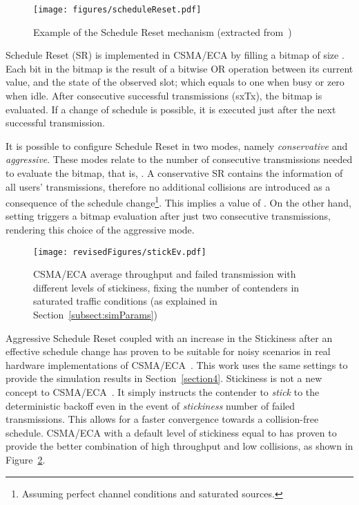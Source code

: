 \documentclass[a4paper]{article}
\begin{document}
	\begin{figure}[t!]
	\centering
		\texttt{[image: figures/scheduleReset.pdf]}
		\caption{Example of the Schedule Reset mechanism (extracted from~\cite{sanabria2014high})}
		\label{fig:scheduleReset1}
	\end{figure}

Schedule Reset (SR) is implemented in CSMA/ECA by filling a bitmap  of size . Each bit  in the bitmap is the result of a bitwise OR operation between its current value,  and the state of the observed slot; which equals to one when busy or zero when idle. After  consecutive successful transmissions (sxTx), the bitmap is evaluated. If a change of schedule is possible, it is executed just after the next successful transmission.

It is possible to configure Schedule Reset in two modes, namely \emph{conservative} and \emph{aggressive}. These modes relate to the number of consecutive transmissions needed to evaluate the bitmap, that is, . A conservative SR contains the information of all users' transmissions, therefore no additional collisions are introduced as a consequence of the schedule change\footnote{Assuming perfect channel conditions and saturated sources.}. This implies a value of . On the other hand, setting  triggers a bitmap evaluation after just two consecutive transmissions, rendering this choice of  the aggressive mode.

\begin{figure}[tb]
	\centering
		\texttt{[image: revisedFigures/stickEv.pdf]}
		\caption{CSMA/ECA average throughput and failed transmission with different levels of stickiness, fixing the number of contenders  in saturated traffic conditions (as explained in Section~\ref{subsect:simParams})}
		\label{fig:stickEv-throughput-overallOnly}
	\end{figure}

Aggressive Schedule Reset coupled with an increase in the Stickiness after an effective schedule change has proven to be suitable for noisy scenarios in real hardware implementations of CSMA/ECA~\cite{sanabria2014high}. This work uses the same settings to provide the simulation results in Section~\ref{section4}. Stickiness is not a new concept to CSMA/ECA~\cite{barcelo2011tcf}. It simply instructs the contender to \emph{stick} to the deterministic backoff even in the event of \emph{stickiness} number of failed transmissions. This allows for a faster convergence towards a collision-free schedule. CSMA/ECA with a default level of stickiness equal to  has proven to provide the better combination of high throughput and low collisions, as shown in Figure~\ref{fig:stickEv-throughput-overallOnly}. 
\end{document}
